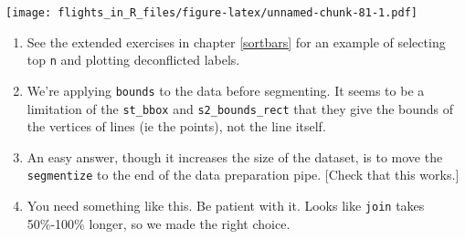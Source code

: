 \documentclass[
]{book}
\newenvironment{Shaded}{\begin{snugshade}}{\end{snugshade}}
\newcommand{\AttributeTok}[1]{\textcolor[rgb]{0.77,0.63,0.00}{#1}}
\newcommand{\CommentTok}[1]{\textcolor[rgb]{0.56,0.35,0.01}{\textit{#1}}}
\newcommand{\DecValTok}[1]{\textcolor[rgb]{0.00,0.00,0.81}{#1}}
\newcommand{\FloatTok}[1]{\textcolor[rgb]{0.00,0.00,0.81}{#1}}
\newcommand{\FunctionTok}[1]{\textcolor[rgb]{0.00,0.00,0.00}{#1}}
\newcommand{\NormalTok}[1]{#1}
\newcommand{\OtherTok}[1]{\textcolor[rgb]{0.56,0.35,0.01}{#1}}
\newcommand{\SpecialCharTok}[1]{\textcolor[rgb]{0.00,0.00,0.00}{#1}}
\newcommand{\StringTok}[1]{\textcolor[rgb]{0.31,0.60,0.02}{#1}}
\providecommand{\tightlist}{%
  \setlength{\itemsep}{0pt}\setlength{\parskip}{0pt}}
\begin{document}
\begin{Shaded}
\end{Shaded}

\texttt{[image: flights\_in\_R\_files/figure-latex/unnamed-chunk-81-1.pdf]}

\begin{enumerate}
\def\labelenumi{\arabic{enumi})}
\setcounter{enumi}{2}
\tightlist
\item
  See the extended exercises in chapter \ref{sortbars} for an example of selecting top \texttt{n} and plotting deconflicted labels.
\item
  We're applying \texttt{bounds} to the data before segmenting. It seems to be a limitation of the \texttt{st\_bbox} and \texttt{s2\_bounds\_rect} that they give the bounds of the vertices of lines (ie the points), not the line itself.
\item
  An easy answer, though it increases the size of the dataset, is to move the \texttt{segmentize} to the end of the data preparation pipe. {[}Check that this works.{]}
\item
  You need something like this. Be patient with it. Looks like \texttt{join} takes 50\%-100\% longer, so we made the right choice.
\end{enumerate}
\end{document}
